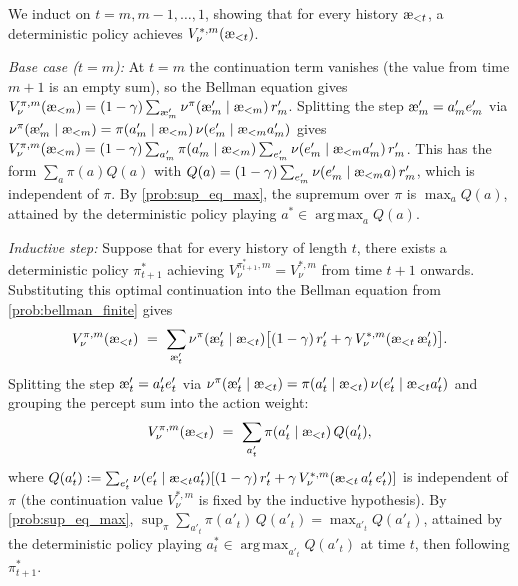 \documentclass[fontsize=11pt, parskip=half]{scrartcl}
\theoremstyle{definition}
\newenvironment{solution}{%
    \begin{tcolorbox}[colback=black!5!white, colframe=black!50!white,
      title={\textbf{Solution}}, fonttitle=\normalfont, breakable]
  }{\end{tcolorbox}}
\newenvironment{solution}{\expandafter\comment}{\expandafter\endcomment}
\DeclareMathOperator*{\argmax}{arg\,max}
\newcommand{\aes}{\textnormal{\ae}}
\begin{document}
\begin{solution}
We induct on $t = m, m-1, \ldots, 1$, showing that for every history $\aes_{<t}$, a deterministic policy achieves $V_\nu^{*,m}(\aes_{<t})$.

\emph{Base case ($t = m$):} At $t = m$ the continuation term vanishes (the value from time $m+1$ is an empty sum), so the Bellman equation gives $V_\nu^{\pi,m}(\aes_{<m}) = (1-\gamma) \sum_{\aes'_m} \nu^\pi(\aes'_m \mid \aes_{<m})\, r'_m$.
Splitting the step $\aes'_m = a'_m e'_m$ via $\nu^\pi(\aes'_m \mid \aes_{<m}) = \pi(a'_m \mid \aes_{<m})\, \nu(e'_m \mid \aes_{<m} a'_m)$ gives $V_\nu^{\pi,m}(\aes_{<m}) = (1-\gamma) \sum_{a'_m} \pi(a'_m \mid \aes_{<m}) \sum_{e'_m} \nu(e'_m \mid \aes_{<m} a'_m)\, r'_m$.
This has the form $\sum_a \pi(a) Q(a)$ with $Q(a) = (1-\gamma)\sum_{e'_m} \nu(e'_m \mid \aes_{<m} a)\, r'_m$, which is independent of $\pi$.
By \cref{prob:sup_eq_max}, the supremum over $\pi$ is $\max_a Q(a)$, attained by the deterministic policy playing $a^* \in \argmax_a Q(a)$.

\emph{Inductive step:} Suppose that for every history of length $t$, there exists a deterministic policy $\pi^*_{t+1}$ achieving $V_\nu^{\pi^*_{t+1},m} = V_\nu^{*,m}$ from time $t+1$ onwards.
Substituting this optimal continuation into the Bellman equation from \cref{prob:bellman_finite} gives
\[
    V_\nu^{\pi,m}(\aes_{<t}) ~=~ \sum_{\aes'_t} \nu^\pi(\aes'_t \mid \aes_{<t}) \big[(1-\gamma)\, r'_t + \gamma\, V_\nu^{*,m}(\aes_{<t}\, \aes'_t)\big].
\]
Splitting the step $\aes'_t = a'_t e'_t$ via $\nu^\pi(\aes'_t \mid \aes_{<t}) = \pi(a'_t \mid \aes_{<t})\, \nu(e'_t \mid \aes_{<t} a'_t)$ and grouping the percept sum into the action weight:
\[
    V_\nu^{\pi,m}(\aes_{<t}) ~=~ \sum_{a'_t} \pi(a'_t \mid \aes_{<t})\, Q(a'_t),
\]
where $Q(a'_t) := \sum_{e'_t} \nu(e'_t \mid \aes_{<t} a'_t) [(1-\gamma)\, r'_t + \gamma\, V_\nu^{*,m}(\aes_{<t}\, a'_t\, e'_t)]$ is independent of $\pi$ (the continuation value $V_\nu^{*,m}$ is fixed by the inductive hypothesis).
By \cref{prob:sup_eq_max}, $\sup_\pi \sum_{a'_t} \pi(a'_t)\, Q(a'_t) = \max_{a'_t} Q(a'_t)$, attained by the deterministic policy playing $a^*_t \in \argmax_{a'_t} Q(a'_t)$ at time $t$, then following $\pi^*_{t+1}$.
\end{solution}
\end{document}
